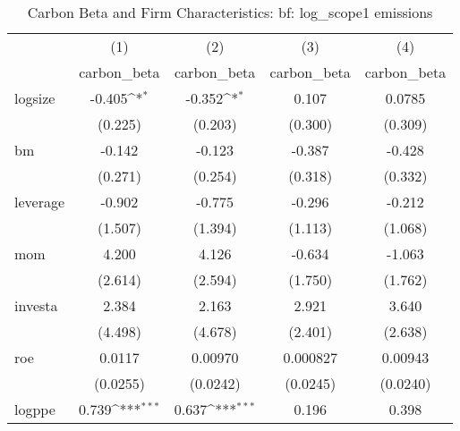 \begin{table}[htbp]\centering
\def\sym#1{\ifmmode^{#1}\else\(^{#1}\)\fi}
\caption{Carbon Beta and Firm Characteristics: {bf: log\_scope1 emissions }}
\begin{tabular}{l*{4}{c}}
\hline\hline
                    &\multicolumn{1}{c}{(1)}&\multicolumn{1}{c}{(2)}&\multicolumn{1}{c}{(3)}&\multicolumn{1}{c}{(4)}\\
                    &\multicolumn{1}{c}{carbon\_beta}&\multicolumn{1}{c}{carbon\_beta}&\multicolumn{1}{c}{carbon\_beta}&\multicolumn{1}{c}{carbon\_beta}\\
\hline
logsize             &      -0.405\sym{*}  &      -0.352\sym{*}  &       0.107         &      0.0785         \\
                    &     (0.225)         &     (0.203)         &     (0.300)         &     (0.309)         \\
[1em]
bm                  &      -0.142         &      -0.123         &      -0.387         &      -0.428         \\
                    &     (0.271)         &     (0.254)         &     (0.318)         &     (0.332)         \\
[1em]
leverage            &      -0.902         &      -0.775         &      -0.296         &      -0.212         \\
                    &     (1.507)         &     (1.394)         &     (1.113)         &     (1.068)         \\
[1em]
mom                 &       4.200         &       4.126         &      -0.634         &      -1.063         \\
                    &     (2.614)         &     (2.594)         &     (1.750)         &     (1.762)         \\
[1em]
investa             &       2.384         &       2.163         &       2.921         &       3.640         \\
                    &     (4.498)         &     (4.678)         &     (2.401)         &     (2.638)         \\
[1em]
roe                 &      0.0117         &     0.00970         &    0.000827         &     0.00943         \\
                    &    (0.0255)         &    (0.0242)         &    (0.0245)         &    (0.0240)         \\
[1em]
logppe              &       0.739\sym{***}&       0.637\sym{***}&       0.196         &       0.398         \\

\end{tabular}
\end{table}
